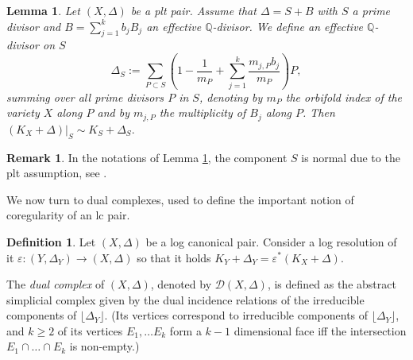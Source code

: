 \documentclass{amsart}
\newcommand{\qq}{\mathbb{Q}}
\newtheorem{lemma}[theorem]{Lemma}
\theoremstyle{definition}
\newtheorem{definition}[theorem]{Definition}
\newtheorem{remark}[theorem]{Remark}
\theoremstyle{remark}
\numberwithin{equation}{section}
\begin{document}
\begin{lemma}\label{lem:coeff-under-adj}
Let $(X,\Delta)$ be a plt pair. Assume that $\Delta=S+B$ with $S$ a prime divisor and $B=\sum_{j=1}^k b_jB_j$ an effective $\qq$-divisor. We define an effective $\mathbb{Q}$-divisor on $S$
\[
\Delta_S := \sum_{P\subset S}\left( 1-\frac{1}{m_P}+\sum_{j=1}^k \frac{m_{j,P}b_j}{m_P}\right)P,
\]
summing over all prime divisors $P$ in $S$, denoting by $m_P$ the orbifold index of the variety $X$ along $P$ and by
$m_{j,P}$ the multiplicity of $B_j$ along $P$.
Then $(K_X+\Delta)|_S \sim K_S+ \Delta_S.$
\end{lemma}

\begin{remark}\label{rem:plt}
In the notations of Lemma \ref{lem:coeff-under-adj}, the component $S$ is normal due to the plt assumption, see \cite[Lemma 3.6]{Sho92}.
\end{remark}

We now turn to dual complexes, used to define the important notion of coregularity of an lc pair.


\begin{definition}
Let $(X,\Delta)$ be a log canonical pair. 
Consider a log resolution of it $\varepsilon\colon (Y,\Delta_Y)\rightarrow (X,\Delta)$ so that it holds $K_Y+\Delta_Y = \varepsilon^*(K_X+\Delta)$.

The {\it dual complex} of $(X,\Delta)$, denoted by $\mathcal{D}(X,\Delta)$, is defined as the abstract simplicial complex given by the dual incidence relations of the irreducible components of $\lfloor\Delta_Y\rfloor$. (Its vertices correspond to irreducible components of $\lfloor\Delta_Y\rfloor$, and $k\ge 2$ of its vertices $E_1,\ldots E_k$ form a $k-1$ dimensional face iff the intersection $E_1\cap\ldots\cap E_k$ is non-empty.)
\end{definition}
\end{document}
